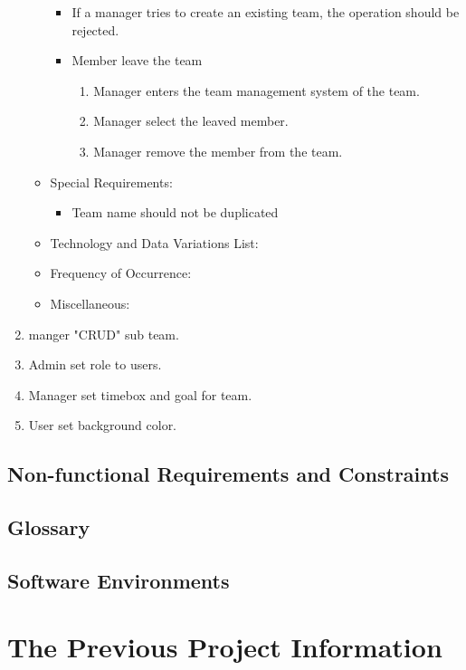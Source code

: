 \documentclass[12pt, a4paper]{article}
\begin{document}
\begin{CJK*}{UTF8}{bkai}
\begin{enumerate}
\begin{itemize}
            \begin{itemize}
              \item If a manager tries to create an existing team, the operation should be rejected.
              \item Member leave the team
                \begin{enumerate}
                  \item Manager enters the team management system of the team.
                  \item Manager select the leaved member.
                  \item Manager remove the member from the team.
                \end{enumerate}
            \end{itemize}
          \item Special Requirements:
            \begin{itemize}
              \item Team name should not be duplicated
            \end{itemize}
          \item Technology and Data Variations List:
          \item Frequency of Occurrence:
          \item Miscellaneous:
        \end{itemize}
      \item manger "CRUD" sub team.
      \item Admin set role to users.
      \item Manager set timebox and goal for team.
      \item User set background color.
    \end{enumerate}

  \subsection{Non-functional Requirements and Constraints}

  \subsection{Glossary}

  \subsection{Software Environments}

\section{The Previous Project Information}

\end{CJK*}
\end{document}
